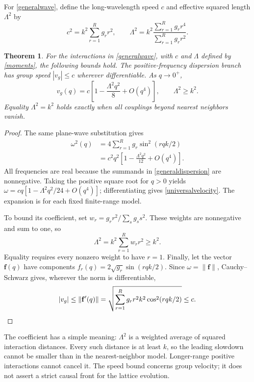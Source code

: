 \documentclass[11pt]{article}
\newtheorem{theorem}[proposition]{Theorem}
\begin{document}
For \eqref{generalwave}, define the long-wavelength speed $c$ and effective squared length $\Lambda^2$ by
\begin{equation}\label{moments}
c^2=k^2\sum_{r=1}^{R}g_r r^2,
\qquad
\Lambda^2=k^2\frac{\sum_{r=1}^{R}g_r r^4}{\sum_{r=1}^{R}g_r r^2}.
\end{equation}
\begin{theorem}\label{universal}
For the interactions in \eqref{generalwave}, with $c$ and $\Lambda$ defined by \eqref{moments}, the following bounds hold.
The positive-frequency dispersion branch has group speed $|v_g|\leq c$ wherever differentiable. As $q\to0^+$,
\begin{equation}\label{universalvelocity}
v_g(q)=c\left[1-\frac{\Lambda^2q^2}{8}+O(q^4)\right],
\qquad \Lambda^2\geq k^2.
\end{equation}
Equality $\Lambda^2=k^2$ holds exactly when all couplings beyond nearest neighbors vanish.
\end{theorem}
\begin{proof}
The same plane-wave substitution gives
\begin{align}
\omega^2(q)&=4\sum_{r=1}^{R}g_r\sin^2(rqk/2)\label{generaldispersion}\\
&=c^2q^2\left[1-\frac{\Lambda^2q^2}{12}+O(q^4)\right].
\end{align}
All frequencies are real because the summands in \eqref{generaldispersion} are nonnegative. Taking the positive square root for $q>0$ yields $\omega=cq[1-\Lambda^2q^2/24+O(q^4)]$; differentiating gives \eqref{universalvelocity}. The expansion is for each fixed finite-range model.

To bound its coefficient, set $w_r=g_r r^2/\sum_s g_s s^2$. These weights are nonnegative and sum to one, so
\begin{equation}\label{momentbound}
\Lambda^2=k^2\sum_{r=1}^{R}w_r r^2\geq k^2.
\end{equation}
Equality requires every nonzero weight to have $r=1$. Finally, let the vector $\mathbf f(q)$ have components $f_r(q)=2\sqrt{g_r}\sin(rqk/2)$. Since $\omega=\|\mathbf f\|$, Cauchy--Schwarz gives, wherever the norm is differentiable,
\begin{equation}
|v_g|\leq\|\mathbf f'(q)\|
=\sqrt{\sum_{r=1}^{R}g_r r^2k^2\cos^2(rqk/2)}\leq c.\qedhere
\end{equation}
\end{proof}
The coefficient has a simple meaning: $\Lambda^2$ is a weighted average of squared interaction distances. Every such distance is at least $k$, so the leading slowdown cannot be smaller than in the nearest-neighbor model. Longer-range positive interactions cannot cancel it. The speed bound concerns group velocity; it does not assert a strict causal front for the lattice evolution.
\end{document}
